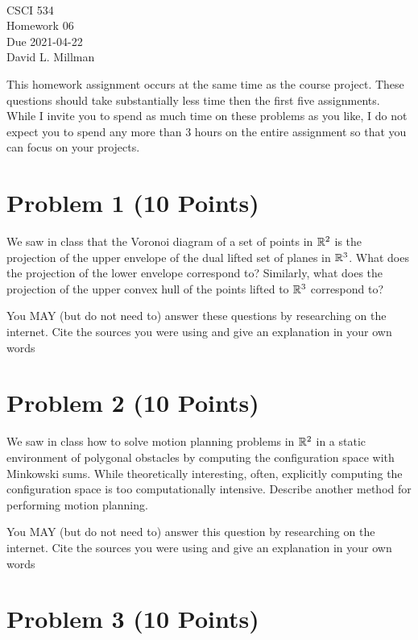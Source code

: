 \documentclass[11pt]{article}
\newcommand{\course}{CSCI 534}
\newcommand{\proj}{Homework 06}
\newcommand{\dueDate}{2021-04-22}
\newcommand{\instructor}{David L. Millman}
\begin{document}
{ ~\\
    \course \\ 
    \proj \\ 
    Due \dueDate \\
    \instructor
}



\vspace{1em}

This homework assignment occurs at the same time as the course project.  These
questions should take substantially less time then the first five assignments.
While I invite you to spend as much time on these problems as you like, I do not
expect you to spend any more than 3 hours on the entire assignment so that you
can focus on your projects.

\section*{Problem 1 (10 Points)}

We saw in class that the Voronoi diagram of a set of points in $\mathbb{R}^2$ is the
projection of the upper envelope of the dual lifted set of planes in $\mathbb{R}^3$.
What does the projection of the lower envelope correspond to? Similarly, what
does the projection of the upper convex hull of the points lifted to $\mathbb{R}^3$
correspond to?

You MAY (but do not need to) answer these questions by researching on the
internet. Cite the sources you were using and give an explanation in your own
words

\section*{Problem 2 (10 Points)}

We saw in class how to solve motion planning problems in $\mathbb{R}^2$ in a static
environment of polygonal obstacles by computing the configuration space with
Minkowski sums.  While theoretically interesting, often, explicitly computing
the configuration space is too computationally intensive.  Describe another
method for performing motion planning.

You MAY (but do not need to) answer this question by researching on the
internet. Cite the sources you were using and give an explanation in your own
words

\section*{Problem 3 (10 Points)}
\end{document}
